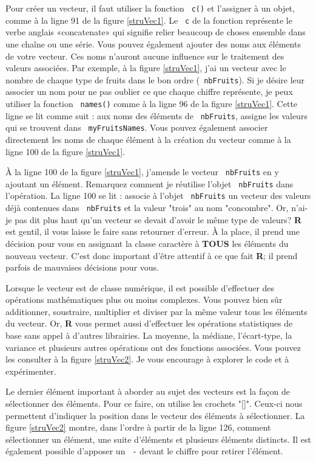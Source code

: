 \documentclass[10.5pt,a4paper]{article}
\newcommand{\rcode}[1]{\texttt{\color{rstudio} #1}}
\begin{document}
    Pour créer un vecteur, il faut utiliser la fonction \rcode{c()} et l'assigner à un objet, comme à la ligne 91 de la figure \ref{struVec1}. Le \rcode{c} de la fonction représente le verbe anglais «concatenate» qui signifie relier beaucoup de choses ensemble dans une chaîne ou une série. Vous pouvez également ajouter des noms aux éléments de votre vecteur. Ces noms n'auront aucune influence sur le traitement des valeurs associées. Par exemple, à la figure \ref{struVec1}, j'ai un vecteur avec le nombre de chaque type de fruits dans le bon ordre (\rcode{nbFruits}). Si je désire leur associer un nom pour ne pas oublier ce que chaque chiffre représente, je peux utiliser la fonction \rcode{names()} comme à la ligne 96 de la figure \ref{struVec1}. Cette ligne se lit comme suit : aux noms des éléments de \rcode{nbFruits}, assigne les valeurs qui se trouvent dans \rcode{myFruitsNames}. Vous pouvez également associer directement les noms de chaque élément à la création du vecteur comme à la ligne 100 de la figure \ref{struVec1}. 
    
    À la ligne 100 de la figure \ref{struVec1}, j'amende le vecteur \rcode{nbFruits} en y ajoutant un élément. Remarquez comment je réutilise l'objet \rcode{nbFruits} dans l'opération. La ligne 100 se lit : associe à l'objet \rcode{nbFruits} un vecteur des valeurs déjà contenues dans \rcode{nbFruits} et la valeur "trois" au nom "concombre". Or, n'ai-je pas dit plus haut qu'un vecteur se devait d'avoir le même type de valeurs? \textbf{R} est gentil, il vous laisse le faire sans retourner d'erreur. À la place, il prend une décision pour vous en assignant la classe caractère à \textbf{TOUS} les éléments du nouveau vecteur. C'est donc important d'être attentif à ce que fait \textbf{R}; il prend parfois de mauvaises décisions pour vous. 
    
    Lorsque le vecteur est de classe numérique, il est possible d'effectuer des opérations mathématiques plus ou moins complexes. Vous pouvez bien sûr additionner, soustraire, multiplier et diviser par la même valeur tous les éléments du vecteur. Or, \textbf{R} vous permet aussi d'effectuer les opérations statistiques de base sans appel à d'autres librairies. La moyenne, la médiane, l'écart-type, la variance et plusieurs autres opérations ont des fonctions associées. Vous pouvez les consulter à la figure \ref{struVec2}. Je vous encourage à explorer le code et à expérimenter. 
    
    Le dernier élément important à aborder au sujet des vecteurs est la façon de sélectionner des éléments. Pour ce faire, on utilise les crochets "[]". Ceux-ci nous permettent d'indiquer la position dans le vecteur des éléments à sélectionner. La figure \ref{struVec2} montre, dans l'ordre à partir de la ligne 126, comment sélectionner un élément, une suite d'éléments et plusieurs éléments distincts. Il est également possible d'apposer un \rcode{-} devant le chiffre pour retirer l'élément. 
    
\end{document}
